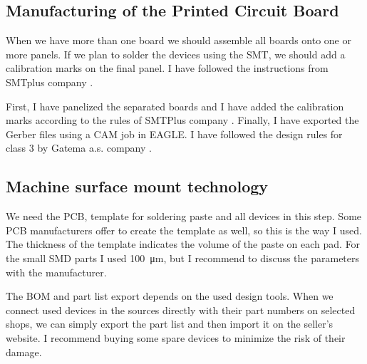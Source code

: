 \subsection{Manufacturing of the Printed Circuit Board}
When we have more than one board we should assemble all boards onto one or more panels. If we plan to solder the devices using the \ac{SMT}, we should add a calibration marks on the final panel. I have followed the instructions from SMTplus company \cite{SMTplusManual}.

First, I have panelized the separated boards and I have added the calibration marks according to the rules of SMTPlus company \cite{SMTplusDesignRules}. Finally, I have exported the Gerber files using a CAM job \cite{GatemaCAMjob} in \ac{EAGLE}. I have followed the design rules for class 3 by Gatema a.s. company \cite{GatemaDesignRules}.

\subsection{Machine surface mount technology}
We need the \ac{PCB}, template for soldering paste and all devices in this step. Some \ac{PCB} manufacturers offer to create the template as well, so this is the way I used. The thickness of the template indicates the volume of the paste on each pad. For the small \ac{SMD} parts I used \SI{100}{\micro\meter}, but I recommend to discuss the parameters with the manufacturer.

The \ac{BOM} and part list export depends on the used design tools. When we connect used devices in the sources directly with their part numbers on selected shops, we can simply export the part list and then import it on the seller's website. I recommend buying some spare devices to minimize the risk of their damage.


